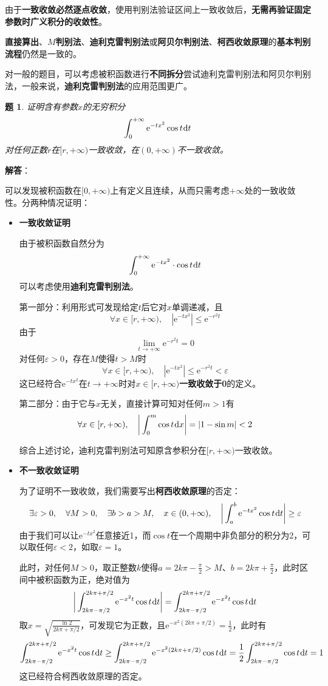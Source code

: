 \documentclass[a4paper,UTF8,fontset=windows,AutoFakeBold]{ctexart}
\newcommand*{\dr}{\hspace{0.07em}\mathrm{d}}
\newcommand*{\er}{\mathrm{e}}
\newcommand*{\note}{\noindent *}
\theoremstyle{ex}
\newtheorem{exercise}{题}
\newcommand{\sol}[1]{{\vspace{5pt}\kaishu\noindent\textbf{解答}：\vspace{-3pt}
\begin{compactitem}
    \item[] #1
\end{compactitem}
}}
\begin{document}
\note 由于\textbf{一致收敛必然逐点收敛}，使用判别法验证区间上一致收敛后，\textbf{无需再验证固定参数时广义积分的收敛性}。

\note \textbf{直接算出}、\textbf{$M$判别法}、\textbf{迪利克雷判别法}或\textbf{阿贝尔判别法}、\textbf{柯西收敛原理}的\textbf{基本判别流程}仍然是一致的。

\note 对一般的题目，可以考虑被积函数进行\textbf{不同拆分}尝试迪利克雷判别法和阿贝尔判别法，一般来说，\textbf{迪利克雷判别法}的应用范围更广。

\begin{framed}
\begin{exercise}
    证明含有参数$x$的无穷积分
    $$\int_0^{+\infty}\er^{-tx^2}\cos t\dr t$$
    对任何正数$r$在$[r,+\infty)$一致收敛，在$(0,+\infty)$不一致收敛。
\end{exercise}
\sol{
    可以发现被积函数在$[0,+\infty)$上有定义且连续，从而只需考虑$+\infty$处的一致收敛性。分两种情况证明：
    \begin{itemize}
        \item \textbf{一致收敛证明}
        
        由于被积函数自然分为
        $$\int_0^{+\infty}\er^{-tx^2}\cdot\cos t\dr t$$
        可以考虑使用\textbf{迪利克雷判别法}。

        第一部分：利用形式可发现给定$t$后它对$x$单调递减，且
        $$\forall x\in[r,+\infty),\quad|\er^{-tx^2}|\le\er^{-r^2t}$$
        由于
        $$\lim_{t\to+\infty}\er^{-r^2t}=0$$
        对任何$\varepsilon>0$，存在$M$使得$t>M$时
        $$\forall x\in[r,+\infty),\quad|\er^{-tx^2}|\le\er^{-r^2t}<\varepsilon$$
        这已经符合$\er^{-tx^2}$在$t\to+\infty$时对$x\in[r,+\infty)$\textbf{一致收敛于0}的定义。

        第二部分：由于它与$x$无关，直接计算可知对任何$m>1$有
        $$\forall x\in[r,+\infty),\quad\bigg|\int_0^m\cos t\dr x\bigg|=|1-\sin m|<2$$

        综合上述讨论，迪利克雷判别法可知原含参积分在$[r,+\infty)$一致收敛。  
        
        \item \textbf{不一致收敛证明}
        
        为了证明不一致收敛，我们需要写出\textbf{柯西收敛原理}的否定：
        $$\exists\varepsilon>0,\quad\forall M>0,\quad\exists b>a>M,\quad x\in(0,+\infty),\quad\bigg|\int_a^b\er^{-tx^2}\cos t\dr t\bigg|\ge\varepsilon$$
        由于我们可以让$\er^{-tx^2}$任意接近1，而$\cos t$在一个周期中非负部分的积分为2，可以取任何$\varepsilon<2$，如取$\varepsilon=1$。

        此时，对任何$M>0$，取正整数$k$使得$a=2k\pi-\frac{\pi}{2}>M$、$b=2k\pi+\frac{\pi}{2}$，此时区间中被积函数为正，绝对值为
        $$\bigg|\int_{2k\pi-\pi/2}^{2k\pi+\pi/2}\er^{-x^2t}\cos t\dr t\bigg|=\int_{2k\pi-\pi/2}^{2k\pi+\pi/2}\er^{-x^2t}\cos t\dr t$$
        取$x=\sqrt{\frac{\ln2}{2k\pi+\pi/2}}$，可发现它为正数，且$\er^{-x^2(2k\pi+\pi/2)}=\frac{1}{2}$，此时有
        $$\int_{2k\pi-\pi/2}^{2k\pi+\pi/2}\er^{-x^2t}\cos t\dr t\ge\int_{2k\pi-\pi/2}^{2k\pi+\pi/2}\er^{-x^2(2k\pi+\pi/2)}\cos t\dr t=\frac{1}{2}\int_{2k\pi-\pi/2}^{2k\pi+\pi/2}\cos t\dr t=1$$
        这已经符合柯西收敛原理的否定。
    \end{itemize}
}
\end{framed}
\end{document}
